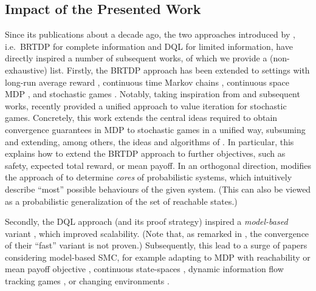 \documentclass{article}
\begin{document}
\subsection{Impact of the Presented Work} \label{sec:intro:influence}

Since its publications about a decade ago, the two approaches introduced by \cite{DBLP:conf/atva/BrazdilCCFKKPU14}, i.e.\ BRTDP for complete information and DQL for limited information, have directly inspired a number of subsequent works, of which we provide a (non-exhaustive) list.
Firstly, the BRTDP approach has been extended to settings with long-run average reward \cite{DBLP:conf/cav/AshokCDKM17}, continuous time Markov chains \cite{DBLP:conf/atva/AshokBHK18}, continuous space MDP \cite{DBLP:conf/concur/GroverKMW22}, and stochastic games \cite{DBLP:journals/iandc/EisentrautKKW22}.
Notably, taking inspiration from \cite{DBLP:conf/atva/BrazdilCCFKKPU14} and subsequent works, \cite{DBLP:conf/lics/KretinskyMW23} recently provided a unified approach to value iteration for stochastic games.
Concretely, this work extends the central ideas required to obtain convergence guarantees in MDP to stochastic games in a unified way, subsuming and extending, among others, the ideas and algorithms of \cite{DBLP:conf/atva/BrazdilCCFKKPU14,DBLP:conf/rp/HaddadM14,DBLP:conf/cav/AshokCDKM17,DBLP:journals/iandc/EisentrautKKW22}.
In particular, this explains how to extend the BRTDP approach to further objectives, such as safety, expected total reward, or mean payoff.
In an orthogonal direction, \cite{DBLP:journals/lmcs/KretinskyM20} modifies the approach of \cite{DBLP:conf/atva/BrazdilCCFKKPU14} to determine \emph{cores} of probabilistic systems, which intuitively describe \enquote{most} possible behaviours of the given system.
(This can also be viewed as a probabilistic generalization of the set of reachable states.)

Secondly, the DQL approach (and its proof strategy) inspired a \emph{model-based} variant \cite{DBLP:conf/cav/AshokKW19}, which improved scalability.
(Note that, as remarked in \cite[Appendix~D]{DBLP:conf/cav/AshokKW19}, the convergence of their \enquote{fast} variant is not proven.)
Subsequently, this lead to a surge of papers considering model-based SMC, for example adapting to MDP with reachability \cite{DBLP:conf/isola/AshokDKW20} or mean payoff objective \cite{DBLP:conf/cav/AgarwalGKM22}, continuous state-spaces \cite{DBLP:journals/jair/BadingsRAPPSJ23}, dynamic information flow tracking games \cite{DBLP:conf/cdc/WeiningerGMK21}, or changing environments \cite{DBLP:conf/nips/SuilenS0022}.
\end{document}
